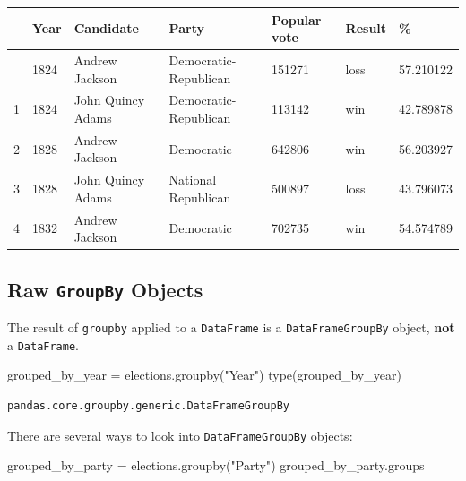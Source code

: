 \documentclass[
  letterpaper,
  DIV=11,
  numbers=noendperiod]{scrreprt}
\newenvironment{Shaded}{\begin{snugshade}}{\end{snugshade}}
\newcommand{\BuiltInTok}[1]{\textcolor[rgb]{0.00,0.23,0.31}{#1}}
\newcommand{\NormalTok}[1]{\textcolor[rgb]{0.00,0.23,0.31}{#1}}
\newcommand{\OperatorTok}[1]{\textcolor[rgb]{0.37,0.37,0.37}{#1}}
\newcommand{\StringTok}[1]{\textcolor[rgb]{0.13,0.47,0.30}{#1}}
\begin{document}
\begin{longtable}[]{@{}lllllll@{}}
\toprule\noalign{}
& Year & Candidate & Party & Popular vote & Result & \% \\
\midrule\noalign{}
\endhead
\bottomrule\noalign{}
\endlastfoot
0 & 1824 & Andrew Jackson & Democratic-Republican & 151271 & loss &
57.210122 \\
1 & 1824 & John Quincy Adams & Democratic-Republican & 113142 & win &
42.789878 \\
2 & 1828 & Andrew Jackson & Democratic & 642806 & win & 56.203927 \\
3 & 1828 & John Quincy Adams & National Republican & 500897 & loss &
43.796073 \\
4 & 1832 & Andrew Jackson & Democratic & 702735 & win & 54.574789 \\
\end{longtable}

\subsection{\texorpdfstring{Raw \texttt{GroupBy}
Objects}{Raw GroupBy Objects}}\label{raw-groupby-objects}

The result of \texttt{groupby} applied to a \texttt{DataFrame} is a
\texttt{DataFrameGroupBy} object, \textbf{not} a \texttt{DataFrame}.

\begin{Shaded}
\begin{Highlighting}[]
\NormalTok{grouped\_by\_year }\OperatorTok{=}\NormalTok{ elections.groupby(}\StringTok{"Year"}\NormalTok{)}
\BuiltInTok{type}\NormalTok{(grouped\_by\_year)}
\end{Highlighting}
\end{Shaded}

\begin{verbatim}
pandas.core.groupby.generic.DataFrameGroupBy
\end{verbatim}

There are several ways to look into \texttt{DataFrameGroupBy} objects:

\begin{Shaded}
\begin{Highlighting}[]
\NormalTok{grouped\_by\_party }\OperatorTok{=}\NormalTok{ elections.groupby(}\StringTok{"Party"}\NormalTok{)}
\NormalTok{grouped\_by\_party.groups}
\end{Highlighting}
\end{Shaded}
\end{document}
